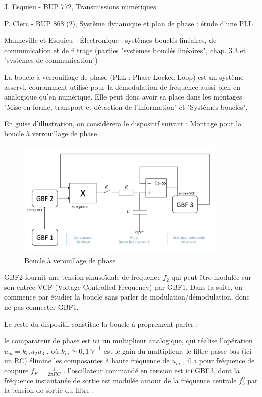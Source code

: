 \documentclass{article}%
\begin{document}
J. Esquieu - BUP 772, Transmissions numériques

P. Clerc - BUP 868 (2), Système dynamique et plan de phase : étude d'une PLL

Manneville et Esquieu - Électronique : systèmes bouclés linéaires, de communication et de filtrage (parties "systèmes bouclés linéaires", chap. 3.3 et "systèmes de communication")


La boucle à verrouillage de phase (PLL : Phase-Locked Loop) est un système asservi, couramment utilisé pour la démodulation de fréquence aussi bien en analogique qu'en numérique. Elle peut donc avoir sa place dans les montages "Mise en forme, transport et détection de l'information" et "Systèmes bouclés".

En guise d'illustration, on considèrera le dispositif suivant :
Montage pour la boucle à verrouillage de phase
\begin{figure}
	\centerline{\includegraphics[width=10cm]{images-exp/PLL.png}}
	\caption{Boucle à verouillage de phase}
\end{figure}

    GBF2 fournit une tension sinusoïdale de fréquence $f_{2 }$ qui peut être modulée sur son entrée VCF (Voltage Controlled Frequency) par GBF1. Dans la suite, on commence par étudier la boucle sans parler de modulation/démodulation, donc ne pas connecter GBF1.

Le reste du dispositif constitue la boucle à proprement parler :

    le comparateur de phase est ici un multiplieur analogique, qui réalise l'opération $u_m = k_m u_2 u_3$ , où $k_m \simeq 0,1 \ V^{-1}$ est le gain du multiplieur.
    le filtre passe-bas (ici un RC) élimine les composantes à haute fréquence de $u_m$ , il a pour fréquence de coupure $ f_F = \frac{1}{2 \pi RC}$ .
    l'oscillateur commandé en tension est ici GBF3, dont la fréquence instantanée de sortie est modulée autour de la fréquence centrale $f_3^0$ par la tension de sortie du filtre :
\end{document}
